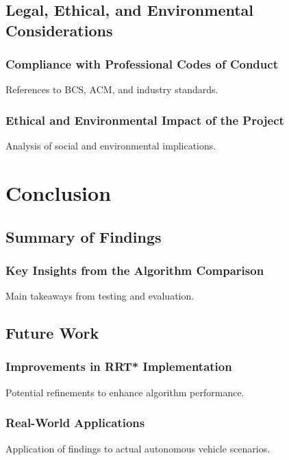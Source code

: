 \documentclass[a4paper,11pt]{report}
\begin{document}
\section{Legal, Ethical, and Environmental Considerations}
\subsection{Compliance with Professional Codes of Conduct}
References to BCS, ACM, and industry standards.

\subsection{Ethical and Environmental Impact of the Project}
Analysis of social and environmental implications.

\newpage

\chapter{Conclusion}
\section{Summary of Findings}
\subsection{Key Insights from the Algorithm Comparison}
Main takeaways from testing and evaluation.

\section{Future Work}
\subsection{Improvements in RRT* Implementation}
Potential refinements to enhance algorithm performance.

\subsection{Real-World Applications}
Application of findings to actual autonomous vehicle scenarios.

\newpage
\end{document}
